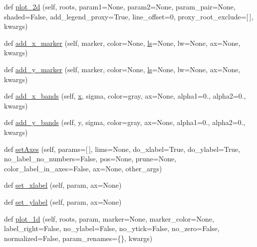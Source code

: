 \begin{DoxyCompactItemize}
def \mbox{\hyperlink{classgetdist_1_1plots_1_1GetDistPlotter_a4a4a4bee3e0232eb2089b2f9b0006909}{plot\+\_\+2d}} (self, roots, param1=None, param2=None, param\+\_\+pair=None, shaded=False, add\+\_\+legend\+\_\+proxy=True, line\+\_\+offset=0, proxy\+\_\+root\+\_\+exclude=\mbox{[}$\,$\mbox{]}, kwargs)
\item 
def \mbox{\hyperlink{classgetdist_1_1plots_1_1GetDistPlotter_a91bd8b0085aa1366a6cb6e8d329da5c4}{add\+\_\+x\+\_\+marker}} (self, marker, color=None, \mbox{\hyperlink{plotTT_8m_aac1113e50f7f1460beeaeeba69f63701}{ls}}=None, lw=None, ax=None, kwargs)
\item 
def \mbox{\hyperlink{classgetdist_1_1plots_1_1GetDistPlotter_a5839922c9cf43552f633678119f6f6de}{add\+\_\+y\+\_\+marker}} (self, marker, color=None, \mbox{\hyperlink{plotTT_8m_aac1113e50f7f1460beeaeeba69f63701}{ls}}=None, lw=None, ax=None, kwargs)
\item 
def \mbox{\hyperlink{classgetdist_1_1plots_1_1GetDistPlotter_aea02dc90ffea867b3c35d641451309ce}{add\+\_\+x\+\_\+bands}} (self, \mbox{\hyperlink{plotTT_8m_a9336ebf25087d91c818ee6e9ec29f8c1}{x}}, sigma, color=\textquotesingle{}gray\textquotesingle{}, ax=None, alpha1=0., alpha2=0., kwargs)
\item 
def \mbox{\hyperlink{classgetdist_1_1plots_1_1GetDistPlotter_ad7176db0b45488015840ae2e1a87162c}{add\+\_\+y\+\_\+bands}} (self, y, sigma, color=\textquotesingle{}gray\textquotesingle{}, ax=None, alpha1=0., alpha2=0., kwargs)
\item 
def \mbox{\hyperlink{classgetdist_1_1plots_1_1GetDistPlotter_afc478614168ba111f0ec1bba56bdb692}{set\+Axes}} (self, params=\mbox{[}$\,$\mbox{]}, lims=None, do\+\_\+xlabel=True, do\+\_\+ylabel=True, no\+\_\+label\+\_\+no\+\_\+numbers=False, pos=None, prune=None, color\+\_\+label\+\_\+in\+\_\+axes=False, ax=None, other\+\_\+args)
\item 
def \mbox{\hyperlink{classgetdist_1_1plots_1_1GetDistPlotter_a307e4b542216e36e71550a6d34a36f49}{set\+\_\+xlabel}} (self, param, ax=None)
\item 
def \mbox{\hyperlink{classgetdist_1_1plots_1_1GetDistPlotter_ae83a5b69313acacabeb99940a25c1004}{set\+\_\+ylabel}} (self, param, ax=None)
\item 
def \mbox{\hyperlink{classgetdist_1_1plots_1_1GetDistPlotter_aab253c97064f41256595e20f5388f86c}{plot\+\_\+1d}} (self, roots, param, marker=None, marker\+\_\+color=None, label\+\_\+right=False, no\+\_\+ylabel=False, no\+\_\+ytick=False, no\+\_\+zero=False, normalized=False, param\+\_\+renames=\{\}, kwargs)

\end{DoxyCompactItemize}
